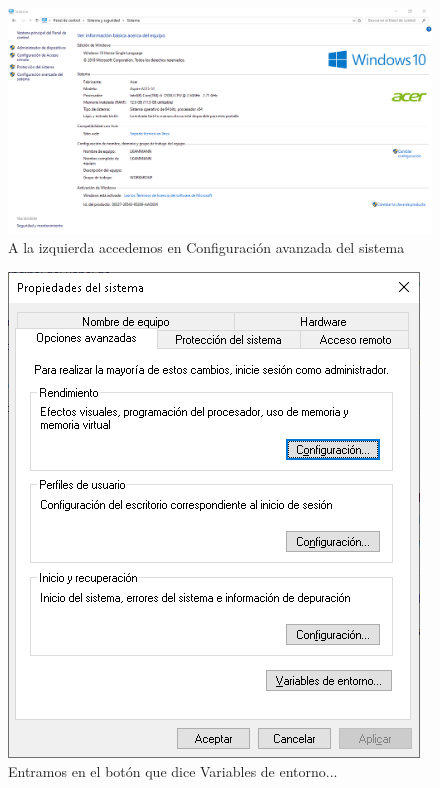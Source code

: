 \begin{figure}[H]
    \centering
    \includegraphics[scale=0.3]{imagenes/cmd/cmd_2.PNG}
    \caption{A la izquierda accedemos en Configuraci\'on avanzada del sistema}
\end{figure}

\begin{figure}[H]
    \centering
    \includegraphics[scale=0.3]{imagenes/cmd/cmd_3.PNG}
    \caption{Entramos en el bot\'on que dice Variables de entorno...}
\end{figure}

